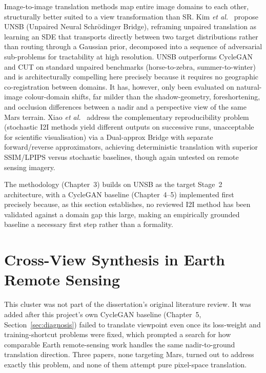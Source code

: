 Image-to-image translation methods map entire image domains to each other, structurally better suited to a view transformation than SR. Kim \textit{et al.}~\cite{kim2024unsb} propose UNSB (Unpaired Neural Schr\"{o}dinger Bridge), reframing unpaired translation as learning an SDE that transports directly between two target distributions rather than routing through a Gaussian prior, decomposed into a sequence of adversarial sub-problems for tractability at high resolution. UNSB outperforms CycleGAN and CUT on standard unpaired benchmarks (horse-to-zebra, summer-to-winter) and is architecturally compelling here precisely because it requires no geographic co-registration between domains. It has, however, only been evaluated on natural-image colour-domain shifts, far milder than the shadow-geometry, foreshortening, and occlusion differences between a nadir and a perspective view of the same Mars terrain. Xiao \textit{et al.}~\cite{xiao2025brownian} address the complementary reproducibility problem (stochastic I2I methods yield different outputs on successive runs, unacceptable for scientific visualisation) via a Dual-approx Bridge with separate forward/reverse approximators, achieving deterministic translation with superior SSIM/LPIPS versus stochastic baselines, though again untested on remote sensing imagery.

The methodology (Chapter~3) builds on UNSB as the target Stage~2 architecture, with a CycleGAN baseline (Chapter~4--5) implemented first precisely because, as this section establishes, no reviewed I2I method has been validated against a domain gap this large, making an empirically grounded baseline a necessary first step rather than a formality.

\section{Cross-View Synthesis in Earth Remote Sensing}
\label{sec:crossview}

This cluster was not part of the dissertation's original literature review. It was added after this project's own CycleGAN baseline (Chapter~5, Section~\ref{sec:diagnosis}) failed to translate viewpoint even once its loss-weight and training-shortcut problems were fixed, which prompted a search for how comparable Earth remote-sensing work handles the same nadir-to-ground translation direction. Three papers, none targeting Mars, turned out to address exactly this problem, and none of them attempt pure pixel-space translation.

